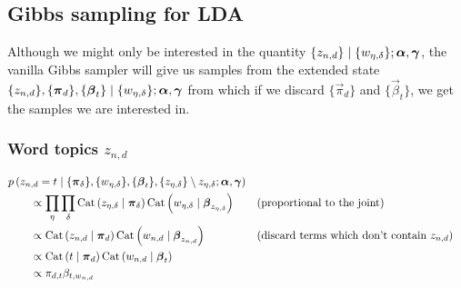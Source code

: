 \subsection{Gibbs sampling for LDA}
Although we might only be interested in the quantity $\{z_{n, d}\} \mid \{w_{\eta, \delta}\}; \boldsymbol{\mathbf{\alpha}}, \boldsymbol{\mathbf{\gamma}}$, the vanilla Gibbs sampler will give us samples from the extended state $\{z_{n, d}\}, \{\boldsymbol{\mathbf{\pi}}_d\}, \{\boldsymbol{\mathbf{\beta}}_t\} \mid \{w_{\eta, \delta}\}; \boldsymbol{\mathbf{\alpha}}, \boldsymbol{\mathbf{\gamma}}$ from which if we discard $\{\vec \pi_d\}$ and $\{\vec \beta_t\}$, we get the samples we are interested in.

\subsubsection{Word topics $z_{n, d}$}
\begin{align}
    \hspace{2em}&\hspace{-2em}
    p\left(z_{n, d} = t \given \{\vec \pi_\delta\}, \{w_{\eta, \delta}\}, \{\vec \beta_t\}, \{z_{\eta, \delta}\} \setminus z_{\eta, \delta}; \vec \alpha, \vec \gamma\right) \nonumber\\
    &\propto \prod_\eta \prod_\delta \Cat\left(z_{\eta, \delta} \given \vec \pi_\delta\right) \Cat\left(w_{\eta, \delta} \given \vec \beta_{z_{\eta, \delta}}\right) && \text{(proportional to the joint)}\nonumber\\
    &\propto \Cat\left(z_{n, d} \given \vec \pi_d\right) \Cat\left(w_{n, d} \given \vec \beta_{z_{n, d}}\right) && \text{(discard terms which don't contain $z_{n, d}$)}\nonumber\\
    &\propto \Cat\left(t \given \vec \pi_d\right) \Cat\left(w_{n, d} \given \vec \beta_t\right) \nonumber\\
    &\propto \pi_{d, t} \beta_{t, w_{n, d}}
\end{align}

